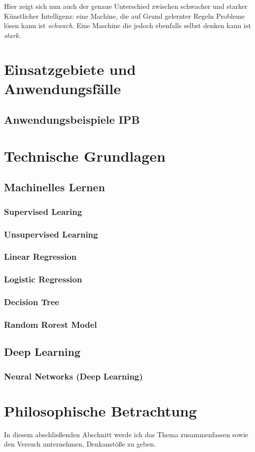 \documentclass[12pt]{report}
\begin{document}
    Hier zeigt sich nun auch der genaue Unterschied zwischen schwacher und starker Künstlicher Intelligenz: eine Machine,
    die auf Grund gelernter Regeln Probleme lösen kann ist \emph{schwach}. Eine Maschine die jedoch ebenfalls selbst denken
    kann ist \emph{stark}.


    \section{Einsatzgebiete und Anwendungsfälle}
    \subsection{Anwendungsbeispiele IPB}

    \section{Technische Grundlagen}
    \subsection{Machinelles Lernen}
    \subsubsection{Supervised Learing}
    \subsubsection{Unsupervised Learning}
    \subsubsection{Linear Regression}
    \subsubsection{Logistic Regression}
    \subsubsection{Decision Tree}
    \subsubsection{Random Rorest Model}

    \subsection{Deep Learning}
    \subsubsection{Neural Networks (Deep Learning)}
    \section{Philosophische Betrachtung}
    In diesem abschließenden Abschnitt werde ich das Thema zusammenfassen sowie den Versuch unternehmen,
    Denkanstöße zu geben.


    \printbibliography
\end{document}
